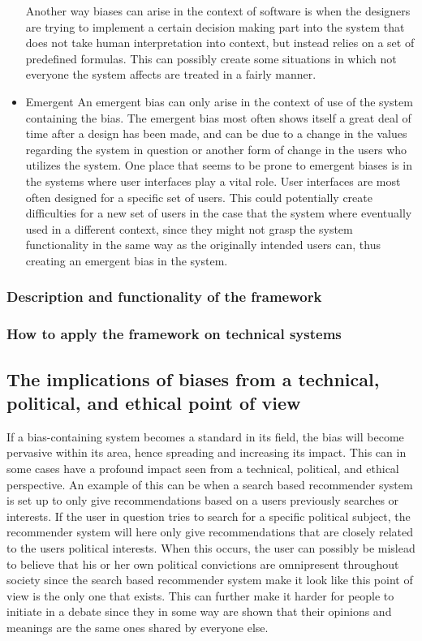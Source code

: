 \begin{itemize}
Another way biases can arise in the context of software is when the designers are trying to implement a certain decision making part into the system that does not take human interpretation into context, but instead relies on a set of predefined formulas. This can possibly create some situations in which not everyone the system affects are treated in a fairly manner.
	\item Emergent
An emergent bias can only arise in the context of use of the system containing the bias. The emergent bias most often shows itself a great deal of time after a design has been made, and can be due to a change in the values regarding the system in question or another form of change in the users who utilizes the system. One place that seems to be prone to emergent biases is in the systems where user interfaces play a vital role. User interfaces are most often designed for a specific set of users. This could potentially create difficulties for a new set of users in the case that the system where eventually used in a different context, since they might not grasp the system functionality in the same way as the originally intended users can, thus creating an emergent bias in the system. 
\end{itemize}

\subsubsection{Description and functionality of the framework}

\subsubsection{How to apply the framework on technical systems}

\subsection{The implications of biases from a technical, political, and ethical point of view}
If a bias-containing system becomes a standard in its field, the bias will become pervasive within its area, hence spreading and increasing its impact. This can in some cases have a profound impact seen from a technical, political, and ethical perspective. An example of this can be when a search based recommender system is set up to only give recommendations based on a users previously searches or interests. If the user in question tries to search for a specific political subject, the recommender system will here only give recommendations that are closely related to the users political interests. When this occurs, the user can possibly be mislead to believe that his or her own political convictions are omnipresent throughout society since the search based recommender system make it look like this point of view is the only one that exists. This can further make it harder for people to initiate in a debate since they in some way are shown that their opinions and meanings are the same ones shared by everyone else.